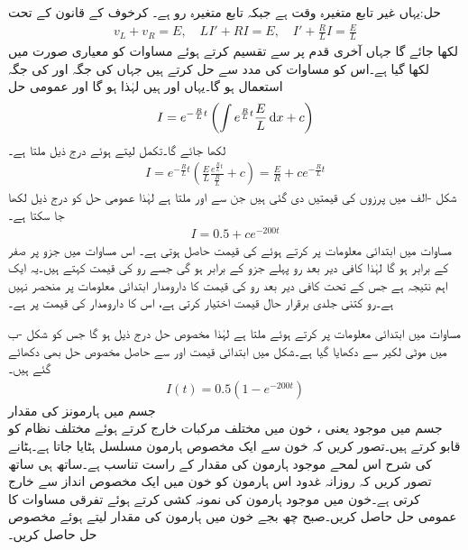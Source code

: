 حل:یہاں غیر تابع متغیرہ وقت  ہے جبکہ تابع متغیرہ رو  ہے۔ کرخوف کے قانون کے تحت 
\begin{align*}
v_L+v_R=E, \quad L I'+RI=E, \quad I'+\frac{R}{L}I=\frac{E}{L}
\end{align*}
لکھا جائے گا جہاں آخری قدم پر  سے تقسیم کرتے ہوئے مساوات کو معیاری صورت میں لکھا گیا ہے۔اس کو مساوات  کی مدد سے حل کرتے ہیں جہاں  کی جگہ  اور  کی جگہ  استعمال ہو گا۔یہاں  اور  ہیں لہٰذا  ہو گا اور عمومی حل
\begin{align*}
I=e^{-\frac{R}{L}t}\left(\int e^{\frac{R}{L}t}  \frac{E}{L} \dif x+c\right)
\end{align*}
لکھا جائے گا۔تکمل لیتے ہوئے درج ذیل ملتا ہے۔
\begin{align}\label{مساوات_سادہ_اول_برقی_مزاحمت_امالہ_سلسلہ_وار}
I=e^{-\frac{R}{L}t}\left(\frac{E}{L} \frac{e^{\frac{R}{L}t}}{\frac{R}{L}}+c\right)=\frac{E}{R}+ce^{-\frac{R}{L}t}
\end{align}
شکل -الف میں پرزوں کی قیمتیں دی گئی ہیں جن سے  اور
  ملتا ہے لہٰذا عمومی حل کو درج ذیل لکھا جا سکتا ہے۔
\begin{align}
I=0.5+ce^{-200t}
\end{align} 
مساوات  میں ابتدائی معلومات پر کرتے ہوئے  کی قیمت حاصل ہوتی ہے۔ اس مساوات میں  جزو  پر صفر کے برابر ہو گا لہٰذا کافی دیر بعد رو پہلے جزو  کے برابر ہو گی جسے رو کی  قیمت کہتے ہیں۔یہ ایک اہم نتیجہ ہے جس کے  تحت کافی دیر بعد رو کی قیمت کا دارومدار ابتدائی معلومات پر منحصر نہیں ہے۔رو کتنی جلدی برقرار حال قیمت اختیار کرتی ہے، اس کا دارومدار  کی قیمت پر ہے۔

مساوات  میں ابتدائی معلومات  پر کرتے   ہوئے  ملتا ہے لہٰذا مخصوص حل درج ذیل ہو گا جس کو شکل -ب میں موٹی لکیر سے دکھایا گیا ہے۔شکل میں ابتدائی قیمت  اور  سے حاصل مخصوص حل بھی دکھائے گئے ہیں۔
\begin{align}
I(t)=0.5(1-e^{-200t})
\end{align}
\quad جسم میں ہارمونز کی مقدار\\
جسم میں موجود  یعنی  ، خون میں مختلف مرکبات خارج کرتے ہوئے مختلف نظام کو قابو کرتے ہیں۔تصور کریں کہ خون سے ایک مخصوص ہارمون مسلسل ہٹایا جاتا ہے۔ہٹانے کی شرح اس لمحے موجود ہارمون کی مقدار کے راست تناسب ہے۔ساتھ ہی ساتھ تصور کریں کہ روزانہ غدود اس ہارمون کو خون میں ایک مخصوص انداز سے خارج کرتی ہے۔خون میں موجود ہارمون کی نمونہ کشی کرتے ہوئے تفرقی مساوات کا عمومی حل حاصل کریں۔صبح چھ بجے خون میں ہارمون کی مقدار  لیتے ہوئے مخصوص حل حاصل کریں۔  

